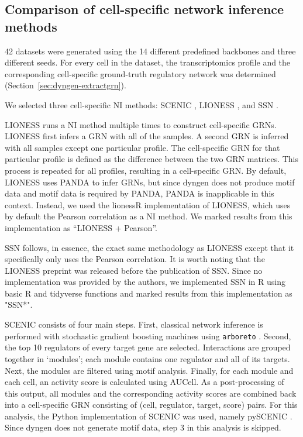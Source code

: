 \documentclass[10pt, a4paper]{article}
\begin{document}
\subsection{Comparison of cell-specific network inference methods}\label{sec:dyngen-nicompare}

42 datasets were generated using the 14 different predefined backbones
and three different seeds. For every cell in the dataset, the
transcriptomics profile and the corresponding cell-specific ground-truth
regulatory network was determined (Section~\ref{sec:dyngen-extractgrn}).

We selected three cell-specific NI methods: SCENIC
\cite{aibar_scenicsinglecellregulatory_2017}, LIONESS
\cite{kuijjer_estimatingsamplespecificregulatory_2015,kuijjer_estimatingsamplespecificregulatory_2019},
and SSN \cite{liu_personalizedcharacterizationdiseases_2016}.

LIONESS \cite{kuijjer_estimatingsamplespecificregulatory_2019} runs
a NI method multiple times to construct cell-specific GRNs. LIONESS
first infers a GRN with all of the samples. A second GRN is inferred
with all samples except one particular profile. The cell-specific GRN
for that particular profile is defined as the difference between the two
GRN matrices. This process is repeated for all profiles, resulting in a
cell-specific GRN. By default, LIONESS uses PANDA
\cite{glass_passingmessagesbiological_2013} to infer GRNs, but since
dyngen does not produce motif data and motif data is required by PANDA,
PANDA is inapplicable in this context. Instead, we used the lionessR
\cite{kuijjer_lionessrsinglesample_2019} implementation of LIONESS,
which uses by default the Pearson correlation as a NI method. We marked
results from this implementation as ``LIONESS + Pearson''.

SSN \cite{liu_personalizedcharacterizationdiseases_2016} follows, in
essence, the exact same methodology as LIONESS except that it
specifically only uses the Pearson correlation. It is worth noting that
the LIONESS preprint was released before the publication of SSN. Since
no implementation was provided by the authors, we implemented SSN in R
using basic R and tidyverse functions
\cite{wickham_welcometidyverse_2019} and marked results from this
implementation as "SSN*".

SCENIC \cite{aibar_scenicsinglecellregulatory_2017} consists of four
main steps. First, classical network inference is performed with
stochastic gradient boosting machines using \texttt{arboreto}
\cite{moerman_grnboost2arboretoefficient_2019}. Second, the top 10
regulators of every target gene are selected. Interactions are grouped
together in `modules'; each module contains one regulator and all of its
targets. Next, the modules are filtered using motif analysis. Finally,
for each module and each cell, an activity score is calculated using
AUCell. As a post-processing of this output, all modules and the
corresponding activity scores are combined back into a cell-specific GRN
consisting of (cell, regulator, target, score) pairs. For this analysis,
the Python implementation of SCENIC was used, namely pySCENIC
\cite{vandesande_scalablescenicworkflow_2020}. Since dyngen does not
generate motif data, step 3 in this analysis is skipped.
\end{document}
